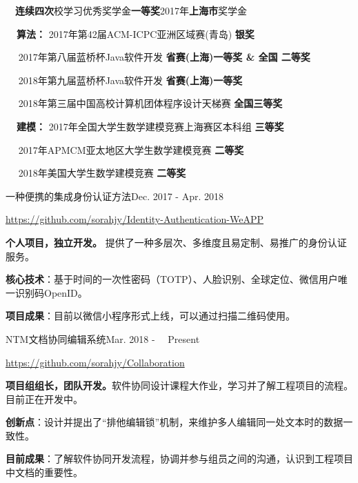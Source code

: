 \documentclass{sorahjy_cv}
\begin{document}
\begin{description}{}
	\item{\ \ }\textbf{连续四次}校学习优秀奖学金\textbf{一等奖}\quad \quad 2017年\textbf{上海市}奖学金
	\item{\textbf{\ \ 算法：}} 2017年第42届ACM-ICPC亚洲区域赛(青岛) \hfill \textbf{银奖}
	\item{\ \ \quad \quad \quad } 2017年第八届蓝桥杯Java软件开发 \hfill \textbf{省赛(上海)一等奖 \& 全国 二等奖}
	\item{\ \ \quad \quad \quad } 2018年第九届蓝桥杯Java软件开发 \hfill \textbf{省赛(上海)一等奖}
	\item{\ \ \quad \quad \quad } 2018年第三届中国高校计算机团体程序设计天梯赛 \hfill \textbf{全国三等奖}
	\item{\textbf{\ \ 建模：}} 2017年全国大学生数学建模竞赛上海赛区本科组 \hfill \textbf{三等奖}
	\item{\ \ \quad \quad \quad } 2017年APMCM亚太地区大学生数学建模竞赛 \hfill \textbf{二等奖}
	\item{\ \ \quad \quad \quad } 2018年美国大学生数学建模竞赛 \hfill \textbf{二等奖}
\end{description}


%
%


\begin{sectionContentSimple}{一种便携的集成身份认证方法}{Dec. 2017 - Apr. 2018}
	\item \url{https://github.com/sorahjy/Identity-Authentication-WeAPP}
	\item \textbf{个人项目，独立开发。} 提供了一种多层次、多维度且易定制、易推广的身份认证服务。
	\item \textbf{核心技术}：基于时间的一次性密码（TOTP）、人脸识别、全球定位、微信用户唯一识别码OpenID。
	\item \textbf{项目成果}：目前以微信小程序形式上线，可以通过扫描二维码使用。
\end{sectionContentSimple}

\begin{sectionContentSimple}{NTM文档协同编辑系统}{Mar. 2018 - \ \ Present \ }
	\item \url{https://github.com/sorahjy/Collaboration}
	\item \textbf{项目组组长，团队开发。}软件协同设计课程大作业，学习并了解工程项目的流程。目前正在开发中。
	\item \textbf{创新点}：设计并提出了“排他编辑锁”机制，来维护多人编辑同一处文本时的数据一致性。
	\item \textbf{目前成果}：了解软件协同开发流程，协调并参与组员之间的沟通，认识到工程项目中文档的重要性。
\end{sectionContentSimple}
\end{document}
